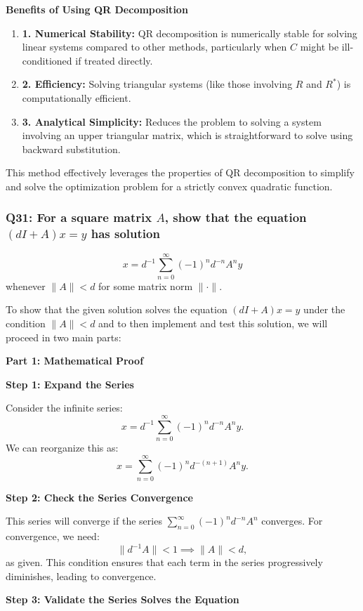 \documentclass[8pt]{article}
\begin{document}
\textbf{Benefits of Using QR Decomposition}

\begin{enumerate}
    \item \textbf{1. Numerical Stability:} QR decomposition is numerically stable for solving linear systems compared to other methods, particularly when \( C \) might be ill-conditioned if treated directly.
    \item \textbf{2. Efficiency:} Solving triangular systems (like those involving \( R \) and \( R^* \)) is computationally efficient.
    \item \textbf{3. Analytical Simplicity:} Reduces the problem to solving a system involving an upper triangular matrix, which is straightforward to solve using backward substitution.
\end{enumerate}

This method effectively leverages the properties of QR decomposition to simplify and solve the optimization problem for a strictly convex quadratic function.

\subsubsection*{Q31: For a square matrix \(A\), show that the equation \( (dI + A)x = y \) has solution}
\[
x = d^{-1} \sum_{n=0}^{\infty} (-1)^n d^{-n} A^n y
\]
whenever \( \|A\| < d \) for some matrix norm \( \| \cdot \| \). 

To show that the given solution solves the equation \( (dI + A)x = y \) under the condition \( \|A\| < d \) and to then implement and test this solution, we will proceed in two main parts:

\textbf{Part 1: Mathematical Proof}

\textbf{Step 1: Expand the Series}

Consider the infinite series:
\[
x = d^{-1} \sum_{n=0}^{\infty} (-1)^n d^{-n} A^n y.
\]
We can reorganize this as:
\[
x = \sum_{n=0}^{\infty} (-1)^n d^{-(n+1)} A^n y.
\]

\textbf{Step 2: Check the Series Convergence}

This series will converge if the series \(\sum_{n=0}^{\infty} (-1)^n d^{-n} A^n\) converges. For convergence, we need:
\[
\|d^{-1} A\| < 1 \implies \|A\| < d,
\]
as given. This condition ensures that each term in the series progressively diminishes, leading to convergence.

\textbf{Step 3: Validate the Series Solves the Equation}
\end{document}
